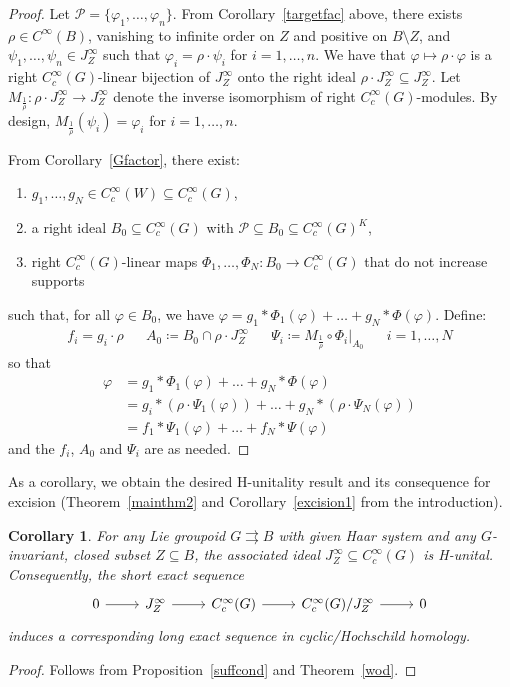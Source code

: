 \documentclass[12pt]{article}
\theoremstyle{plain}
\newtheorem{cor}[thm]{Corollary}
\theoremstyle{definition}
\numberwithin{equation}{section}
\begin{document}
\begin{proof}
Let $\mathscr{P} = \{ \varphi_1,\ldots,\varphi_n\}$. From Corollary~\ref{targetfac} above, there exists $\rho \in C^\infty(B)$,  vanishing to infinite order on $Z$ and positive on $B\setminus Z$,  and $\psi_1,\ldots,\psi_n \in J^\infty_Z$ such that $\varphi_i = \rho \cdot \psi_i$ for $i=1,\ldots,n$. We have that $\varphi \mapsto \rho \cdot \varphi$ is a right $C_c^\infty(G)$-linear bijection of $J_Z^\infty$ onto the right ideal $\rho \cdot J_Z^\infty \subseteq J_Z^\infty$. Let $M_{\frac{1}{\rho}}: \rho\cdot J_Z^\infty \to J_Z^\infty$ denote the inverse isomorphism of right $C_c^\infty(G)$-modules. By design, $M_{\frac{1}{\rho}}(\psi_i)=\varphi_i$ for $i=1,\ldots,n$. 





From Corollary~\ref{Gfactor}, there exist:
\begin{enumerate}
\item $g_1,\ldots,g_N \in C_c^\infty(W) \subseteq C_c^\infty(G)$,
\item a right ideal $B_0 \subseteq C_c^\infty(G)$ with $\mathscr{P} \subseteq B_0 \subseteq C_c^\infty(G)^K$,
\item right $C_c^\infty(G)$-linear maps $\Phi_1,\ldots,\Phi_N:B_0  \to C_c^\infty(G)$ that do not increase supports
\end{enumerate}
such that, for all $\varphi \in B_0$, we have $\varphi = g_1*\Phi_1(\varphi)+\ldots+g_N*\Phi(\varphi)$. Define:
\begin{align*}
f_i = g_i \cdot \rho && A_0 \coloneqq B_0 \cap \rho \cdot J_Z^\infty && \Psi_i \coloneqq M_{\frac{1}{\rho}} \circ \Phi_i|_{A_0}  && i=1,\ldots,N
\end{align*}
so that
\begin{align*}
\varphi &= g_1*\Phi_1(\varphi)+\ldots+g_N*\Phi(\varphi) \\
&= g_i*(\rho\cdot \Psi_1(\varphi))+\ldots+g_N*(\rho\cdot \Psi_N(\varphi)) \\
&= f_1*\Psi_1(\varphi)+\ldots+f_N*\Psi(\varphi) 
\end{align*}
and the $f_i$, $A_0$ and $\Psi_i$ are as needed.
\end{proof}


As a corollary, we obtain the desired H-unitality result and its consequence for excision (Theorem~\ref{mainthm2} and Corollary~\ref{excision1} from the introduction).

\begin{cor}
For any Lie groupoid $G\rightrightarrows B$ with given Haar system and any $G$-invariant, closed subset $Z \subseteq B$, the associated ideal $J_Z^\infty \subseteq C_c^\infty(G)$ is H-unital. Consequently, the short exact sequence
\[ 
\begin{tikzcd}
0 \ar[r] & J_Z^\infty \ar[r] & C_c^\infty(G) \ar[r] & C_c^\infty(G)/J_Z^\infty \ar[r] & 0 
\end{tikzcd}
\]
induces a corresponding long exact sequence in cyclic/Hochschild homology.
\end{cor}
\begin{proof}
Follows from Proposition~\ref{suffcond} and Theorem~\ref{wod}.
\end{proof}
\end{document}
